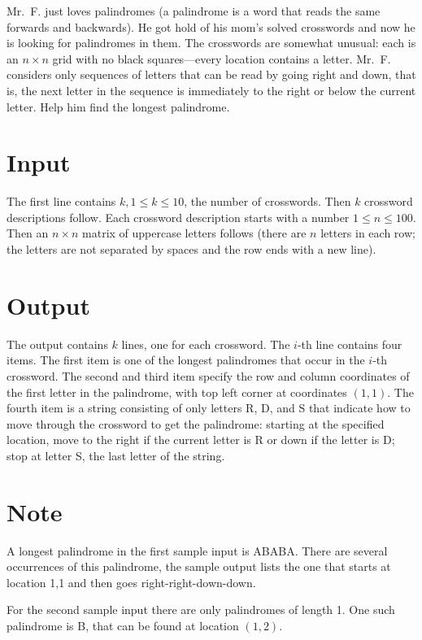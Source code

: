 
Mr.~F. just loves palindromes (a palindrome is a word that reads the same
forwards and backwards). He got hold of his mom's solved
crosswords and now he is looking for palindromes in them. The crosswords are somewhat unusual: each is an $n\times n$ grid with no black squares---every location contains a letter. Mr.~F.
considers only sequences of letters that can be read by going
right and down, that is, the next letter in the sequence
is immediately to the right or below the current letter. Help him find the
longest palindrome.

\section*{Input}
The first line contains $k, 1\le k \le 10$, the number of crosswords. Then $k$
crossword descriptions follow. Each crossword description starts
with a number $1\le n\le 100$. Then an $n\times n$ matrix
of uppercase letters follows (there are $n$ letters in each
row; the letters are not separated by spaces and the row ends with a new line).


\section*{Output}
The output contains $k$ lines, one for each crossword. The $i$-th
line contains four items. The first item is one of the longest palindromes that occur in the $i$-th crossword.
The second and third item specify the row and column coordinates of the first letter in the
palindrome, with top left corner at coordinates $(1,1)$.
The fourth item is a string consisting of only letters R, D, and S that indicate how to move through the crossword to get the palindrome:
starting at the specified location, move to the right if the current letter is R or down if the letter is D; stop at letter S, the last letter of the string.


\section*{Note}
A longest palindrome in the first sample input is ABABA. There are several occurrences of this palindrome, the sample output lists the one that starts at location 1,1 and then goes right-right-down-down.

For the second sample input there are only palindromes of length 1. One such palindrome is B, that
can be found at location $(1,2)$.
